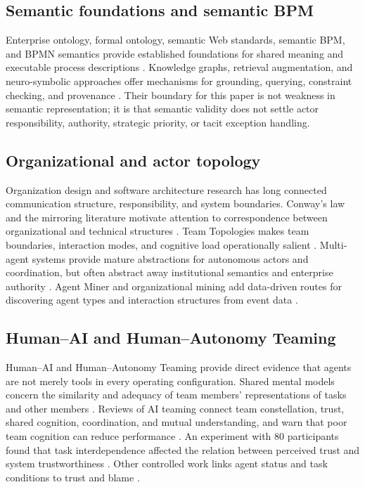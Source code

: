 \documentclass[11pt,letterpaper]{article}
\newcommand{\parencite}[1]{\citep{#1}}
\begin{document}
\subsection{Semantic foundations and semantic BPM}
Enterprise ontology, formal ontology, semantic Web standards, semantic BPM, and BPMN semantics provide established foundations for shared meaning and executable process descriptions \parencite{gruber1993translation,guarino1998formal,hepp2005semantic,annane2019bbo}. Knowledge graphs, retrieval augmentation, and neuro-symbolic approaches offer mechanisms for grounding, querying, constraint checking, and provenance \parencite{lewis2020retrieval,pan2024unifying,sarker2021neuro}. Their boundary for this paper is not weakness in semantic representation; it is that semantic validity does not settle actor responsibility, authority, strategic priority, or tacit exception handling.

\subsection{Organizational and actor topology}
Organization design and software architecture research has long connected communication structure, responsibility, and system boundaries. Conway's law and the mirroring literature motivate attention to correspondence between organizational and technical structures \parencite{conway1968committees,macCormack2012exploring}. Team Topologies makes team boundaries, interaction modes, and cognitive load operationally salient \parencite{skelton2019team}. Multi-agent systems provide mature abstractions for autonomous actors and coordination, but often abstract away institutional semantics and enterprise authority \parencite{wooldridge1995intelligent,dorri2018multiagent}. Agent Miner and organizational mining add data-driven routes for discovering agent types and interaction structures from event data \parencite{tour2023agentminer,orgmining2026}.

\subsection{Human--AI and Human--Autonomy Teaming}
Human--AI and Human--Autonomy Teaming provide direct evidence that agents are not merely tools in every operating configuration. Shared mental models concern the similarity and adequacy of team members' representations of tasks and other members \parencite{andrews2022smm}. Reviews of AI teaming connect team constellation, trust, shared cognition, coordination, and mutual understanding, and warn that poor team cognition can reduce performance \parencite{schmutz2024aiteaming}. An experiment with 80 participants found that task interdependence affected the relation between perceived trust and system trustworthiness \parencite{verhagen2024trust}. Other controlled work links agent status and task conditions to trust and blame \parencite{gall2024trust}.
\end{document}
